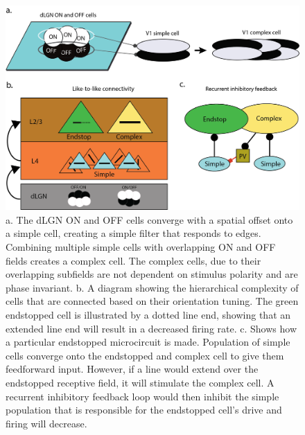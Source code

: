 \documentclass[12pt]{article}
\begin{document}
\begin{figure}[H]
  \centering
  \includegraphics[width=1.0 \textwidth]{adjusted_figures/LIF_Overview_Receptive_Field_Methods.png}
  \caption{a. The dLGN ON and OFF cells converge with a spatial offset onto a simple cell, creating a simple filter that responds to edges. Combining multiple simple cells with overlapping ON and OFF fields creates a complex cell. The complex cells, due to their overlapping subfields are not dependent on stimulus polarity and are phase invariant. b. A diagram showing the hierarchical complexity of cells that are connected based on their orientation tuning. The green endstopped cell is illustrated by a dotted line end, showing that an extended line end will result in a decreased firing rate. c. Shows how a particular endstopped microcircuit is made. Population of simple cells converge onto the endstopped and complex cell to give them feedforward input. However, if a line would extend over the endstopped receptive field, it will stimulate the complex cell. A recurrent inhibitory feedback loop would then inhibit the simple population that is responsible for the endstopped cell's drive and firing will decrease.}
  \label{fig:LIF_Overview}
\end{figure}
\end{document}
